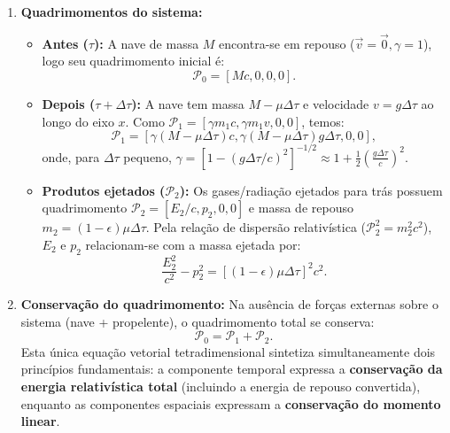 \documentclass[11pt, a4paper]{article}
\begin{document}
\begin{enumerate}[label=\alph*)]
    \item \textbf{Quadrimomentos do sistema:}
    \begin{itemize}
        \item \textbf{Antes ($\tau$):} A nave de massa $M$ encontra-se em repouso ($\vec{v} = \vec{0}, \gamma = 1$), logo seu quadrimomento inicial é:
        \begin{equation}
        \mathcal{P}_0 = [M c, 0, 0, 0].
        \end{equation}
        \item \textbf{Depois ($\tau + \Delta \tau$):} A nave tem massa $M - \mu \Delta \tau$ e velocidade $v = g \Delta \tau$ ao longo do eixo $x$. Como $\mathcal{P}_1 = [\gamma m_1 c, \gamma m_1 v, 0, 0]$, temos:
        \begin{equation}
        \mathcal{P}_1 = [\gamma (M - \mu \Delta \tau) c, \gamma (M - \mu \Delta \tau) g \Delta \tau, 0, 0],
        \end{equation}
        onde, para $\Delta \tau$ pequeno, $\gamma = \left[ 1 - (g \Delta \tau / c)^2 \right]^{-1/2} \approx 1 + \frac{1}{2} \left( \frac{g \Delta \tau}{c} \right)^2$.
        \item \textbf{Produtos ejetados ($\mathcal{P}_2$):} Os gases/radiação ejetados para trás possuem quadrimomento $\mathcal{P}_2 = [E_2/c, p_2, 0, 0]$ e massa de repouso $m_2 = (1 - \epsilon)\mu \Delta \tau$. Pela relação de dispersão relativística ($\mathcal{P}_2^2 = m_2^2 c^2$), $E_2$ e $p_2$ relacionam-se com a massa ejetada por:
        \begin{equation}
        \frac{E_2^2}{c^2} - p_2^2 = \left[ (1 - \epsilon) \mu \Delta \tau \right]^2 c^2. \label{eq:disp_p2}
        \end{equation}
    \end{itemize}

    \item \textbf{Conservação do quadrimomento:} Na ausência de forças externas sobre o sistema (nave + propelente), o quadrimomento total se conserva:
    \begin{equation}
    \mathcal{P}_0 = \mathcal{P}_1 + \mathcal{P}_2.
    \end{equation}
    Esta única equação vetorial tetradimensional sintetiza simultaneamente dois princípios fundamentais: a componente temporal expressa a \textbf{conservação da energia relativística total} (incluindo a energia de repouso convertida), enquanto as componentes espaciais expressam a \textbf{conservação do momento linear}.


\end{enumerate}
\end{document}
